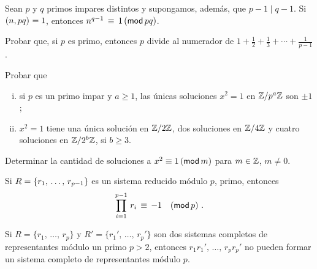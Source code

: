 \begin{ejerModulares}
	Sean $p$ y $q$ primos impares distintos y supongamos, adem\'as,
	que $p-1\mid q-1$. Si $\mcd{n,pq}=1$, entonces
	\begin{math}
		n^{q-1}\,\equiv\,1\tmodulo[pq]
	\end{math}.%
\end{ejerModulares}

\begin{ejerModulares}
	Probar que, si $p$ es primo, entonces $p$ divide al numerador de
	$1+\frac 1{2}+\frac 1{3}+\cdots+\frac 1{p-1}$.
\end{ejerModulares}

\begin{ejerModulares}\label{ejer:modulares:residuos}
	Probar que
	\begin{enumerate}[(i)]
		\item\label{item:ejer:modulares:residuos:primo-impar}
			si $p$ es un primo impar y $a\geq 1$,
			las \'unicas soluciones $x^2=1$ en $\Enterosmod[p^a]$
			son $\pm 1$;
		\item\label{item:ejer:modulares:residuos:dos}
			$x^2=1$ tiene una \'unica soluci\'on en
			$\Enterosmod[2]$, dos soluciones en $\Enterosmod[4]$
			y cuatro soluciones en $\Enterosmod[2^b]$, si
			$b\geq 3$.
	\end{enumerate}
	Determinar la cantidad de soluciones a $x^2\equiv 1\tmodulo[m]$
	para $m\in\Enteros$, $m\neq 0$.%
\end{ejerModulares}

\begin{ejerModulares}
	Si $R=\{\lista r{p-1}\}$ es un sistema reducido m\'odulo $p$, primo,
	entonces
	\begin{displaymath}
		\prod_{i=1}^{p-1}\,r_i\,\equiv\,-1\modulo[p]
		\text{ .}
	\end{displaymath}
\end{ejerModulares}

\begin{ejerModulares}
	Si $R=\{r_1,\,\dots,\,r_p\}$ y $R'=\{r_1',\,\dots,\,r_p'\}$ son
	dos sistemas completos de representantes m\'odulo un primo $p>2$,
	entonces $r_1r_1',\,\dots,\,r_pr_p'$ no pueden formar un sistema
	completo de representantes m\'odulo $p$.
\end{ejerModulares}


